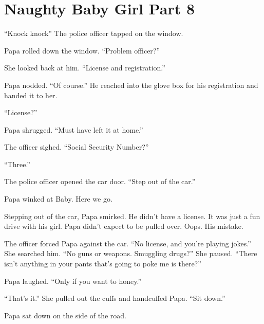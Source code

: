 \section{Naughty Baby Girl Part 8}

    “Knock knock” The police officer tapped on the window.

    Papa rolled down the window. “Problem officer?”

    She looked back at him. “License and registration.”

    Papa nodded. “Of course.” He reached into the glove box for his registration and handed it to her.

    “License?”

    Papa shrugged. “Must have left it at home.”

    The officer sighed. “Social Security Number?”

    “Three.”

    The police officer opened the car door. “Step out of the car.”

    Papa winked at Baby. Here we go.

    Stepping out of the car, Papa smirked. He didn’t have a license. It was just a fun drive with his girl. Papa didn’t expect to be pulled over. Oops. His mistake.

    The officer forced Papa against the car. “No license, and you’re playing jokes.” She searched him. “No guns or weapons. Smuggling drugs?” She paused. “There isn’t anything in your pants that’s going to poke me is there?”

    Papa laughed. “Only if you want to honey.”

    “That’s it.” She pulled out the cuffs and handcuffed Papa. “Sit down.”

    Papa sat down on the side of the road.


